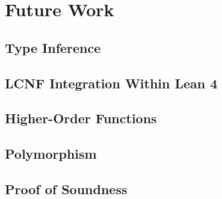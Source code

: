 \chapter{Future Work}\label{sec:futurework}

\section{Type Inference}

\section{LCNF Integration Within Lean 4}

\section{Higher-Order Functions}

\section{Polymorphism}

\section{Proof of Soundness}
